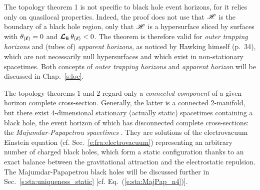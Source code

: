 \begin{remark}
The topology theorem 1 is not specific to black hole event horizons, for
it relies only on quasilocal properties. Indeed, the proof does not use
that $\mathscr{H}$ is the boundary of a black hole region, only that $\mathscr{H}$ is a hypersurface
sliced by surfaces with $\theta_{(\bm{\ell})} = 0$ and $\bm{\mathcal{L}}_{\bm{k}}\, \theta_{(\bm{\ell})} < 0$.
The theorem is therefore valid for \emph{outer trapping horizons} \cite{Haywa94}
and (tubes of) \emph{apparent horizons}, as noticed by Hawking himself \cite{Hawki73} (p.~34),
which are not necessarily null hypersurfaces and which exist in non-stationary spacetimes.
Both concepts of \emph{outer trapping horizons} and \emph{apparent horizon}
will be discussed in Chap.~\ref{s:loc}.
\end{remark}

\begin{remark}
\label{r:sta:Majumdar_Papapetrou}
The topology theorems 1 and 2 regard only
a \emph{connected component} of a given horizon complete cross-section.
Generally, the latter is a connected 2-manifold, but there exist
4-dimensional stationary (actually static) spacetimes containing a black hole,
the event horizon of which has
disconnected complete cross-sections: the
\emph{Majumdar-Papapetrou spacetimes}
\cite{Majum47,Papap47,HartlH72}. They are solutions of the
electrovacuum Einstein equation (cf. Sec.~\ref{e:fra:electrovacuum})
representing an arbitrary number of charged black holes,
which form a static configuration thanks to
an exact balance between the gravitational
attraction and the electrostatic repulsion. The Majumdar-Papapetrou black holes will be discussed
further in Sec.~\ref{s:sta:uniqueness_static} [cf. Eq.~(\ref{e:sta:MajPap_n4})].
\end{remark}

